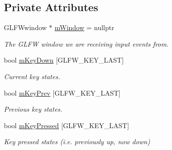 \subsection*{Private Attributes}
\begin{DoxyCompactItemize}
\item 
\mbox{\label{class_input_system_a01b068005a19c8173c7b42c1a0458620}} 
G\+L\+F\+Wwindow $\ast$ \mbox{\hyperlink{class_input_system_a01b068005a19c8173c7b42c1a0458620}{m\+Window}} = nullptr
\begin{DoxyCompactList}\small\item\em The G\+L\+FW window we are receiving input events from. \end{DoxyCompactList}\item 
\mbox{\label{class_input_system_af0c9b1e6ea8b2eae77f6e928b551195e}} 
bool \mbox{\hyperlink{class_input_system_af0c9b1e6ea8b2eae77f6e928b551195e}{m\+Key\+Down}} \mbox{[}G\+L\+F\+W\+\_\+\+K\+E\+Y\+\_\+\+L\+A\+ST\mbox{]}
\begin{DoxyCompactList}\small\item\em Current key states. \end{DoxyCompactList}\item 
\mbox{\label{class_input_system_a611d4a9d716e4b6b0a42fa188628b063}} 
bool \mbox{\hyperlink{class_input_system_a611d4a9d716e4b6b0a42fa188628b063}{m\+Key\+Prev}} \mbox{[}G\+L\+F\+W\+\_\+\+K\+E\+Y\+\_\+\+L\+A\+ST\mbox{]}
\begin{DoxyCompactList}\small\item\em Previous key states. \end{DoxyCompactList}\item 
\mbox{\label{class_input_system_ab15cffa17c0cc8c132a8baa1a8d0d94e}} 
bool \mbox{\hyperlink{class_input_system_ab15cffa17c0cc8c132a8baa1a8d0d94e}{m\+Key\+Pressed}} \mbox{[}G\+L\+F\+W\+\_\+\+K\+E\+Y\+\_\+\+L\+A\+ST\mbox{]}
\begin{DoxyCompactList}\small\item\em Key pressed states (i.\+e. previously up, now down) \end{DoxyCompactList}\item 
\mbox{\label{class_input_system_aabf86f9a2e9ca112ee4a794d62e63d8d}} 

\end{DoxyCompactItemize}
